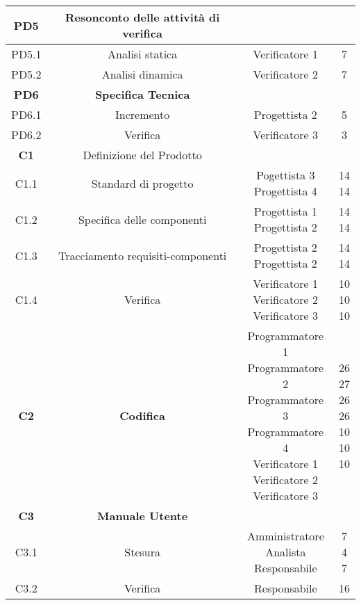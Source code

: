 \documentclass{scalatekids-article}
\begin{document}
\begin{center}
\begin{tabular}{| c | c | c | c |}
    \hline
    \textbf{PD5} & \textbf{Resonconto delle attività di verifica} & &\\
    \hline
    PD5.1 & Analisi statica & Verificatore 1 & 7\\
    \hline
    PD5.2 & Analisi dinamica & Verificatore 2 & 7\\
    \hline
    \textbf{PD6} & \textbf{Specifica Tecnica} & &\\
    \hline
    PD6.1 & Incremento & Progettista 2 & 5\\
    \hline
    PD6.2 & Verifica & Verificatore 3 & 3\\
    \hline
    \textbf{C1} & Definizione del Prodotto & &\\
    \hline
    C1.1 & Standard di progetto & \multiLineCell[t]{Pogettista 3\\Progettista 4} & \multiLineCell[t]{14\\14}\\
    \hline
    C1.2 & Specifica delle componenti & \multiLineCell[t]{Progettista 1\\Progettista 2} & \multiLineCell[t]{14\\14}\\
    \hline
    C1.3 & Tracciamento requisiti-componenti & \multiLineCell[t]{Progettista 2\\Progettista 2} & \multiLineCell[t]{14\\14}\\
    \hline
    C1.4 & Verifica & \multiLineCell[t]{Verificatore 1\\Verificatore 2\\Verificatore 3} & \multiLineCell[t]{10\\10\\10}\\
    \hline
    \textbf{C2} & \textbf{Codifica} & \multiLineCell[t]{Programmatore 1\\Programmatore 2\\Programmatore 3\\Programmatore 4\\Verificatore 1\\Verificatore 2\\Verificatore 3} & \multiLineCell[t]{26\\27\\26\\26\\10\\10\\10}\\
    \hline
    \textbf{C3} & \textbf{Manuale Utente} & &\\
    \hline
    C3.1 & Stesura & \multiLineCell[t]{Amministratore\\Analista\\Responsabile} & \multiLineCell[t]{7\\4\\7}\\
    \hline
    C3.2 & Verifica & Responsabile & 16\\
    \hline
  \end{tabular}
\end{center}
\normalsize
\newpage
\end{document}
